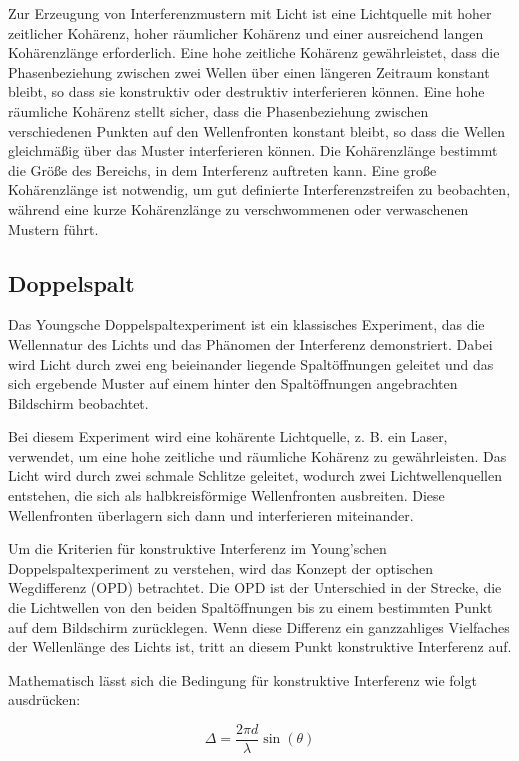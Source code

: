 \documentclass[12pt,english,ngerman]{scrartcl}
\begin{document}
Zur Erzeugung von Interferenzmustern mit Licht ist eine Lichtquelle mit hoher
zeitlicher Kohärenz, hoher räumlicher Kohärenz und einer ausreichend langen
Kohärenzlänge erforderlich. Eine hohe zeitliche Kohärenz gewährleistet, dass
die Phasenbeziehung zwischen zwei Wellen über einen längeren Zeitraum konstant
bleibt, so dass sie konstruktiv oder destruktiv interferieren können. Eine hohe
räumliche Kohärenz stellt sicher, dass die Phasenbeziehung zwischen
verschiedenen Punkten auf den Wellenfronten konstant bleibt, so dass die Wellen
gleichmäßig über das Muster interferieren können. Die Kohärenzlänge bestimmt
die Größe des Bereichs, in dem Interferenz auftreten kann. Eine große
Kohärenzlänge ist notwendig, um gut definierte Interferenzstreifen zu
beobachten, während eine kurze Kohärenzlänge zu verschwommenen oder
verwaschenen Mustern führt.

\subsection{Doppelspalt}

Das Youngsche Doppelspaltexperiment ist ein klassisches Experiment, das die
Wellennatur des Lichts und das Phänomen der Interferenz demonstriert. Dabei
wird Licht durch zwei eng beieinander liegende Spaltöffnungen geleitet und das
sich ergebende Muster auf einem hinter den Spaltöffnungen angebrachten
Bildschirm beobachtet.

Bei diesem Experiment wird eine kohärente Lichtquelle, z. B. ein Laser,
verwendet, um eine hohe zeitliche und räumliche Kohärenz zu gewährleisten. Das
Licht wird durch zwei schmale Schlitze geleitet, wodurch zwei
Lichtwellenquellen entstehen, die sich als halbkreisförmige Wellenfronten
ausbreiten. Diese Wellenfronten überlagern sich dann und interferieren
miteinander.

Um die Kriterien für konstruktive Interferenz im Young'schen
Doppelspaltexperiment zu verstehen, wird das Konzept der optischen Wegdifferenz
(OPD) betrachtet. Die OPD ist der Unterschied in der Strecke, die die
Lichtwellen von den beiden Spaltöffnungen bis zu einem bestimmten Punkt auf dem
Bildschirm zurücklegen. Wenn diese Differenz ein ganzzahliges Vielfaches der
Wellenlänge des Lichts ist, tritt an diesem Punkt konstruktive Interferenz auf.

Mathematisch lässt sich die Bedingung für konstruktive Interferenz wie folgt
ausdrücken:

\begin{equation}
	\Delta = \frac{2\pi d}{\lambda}\sin(\theta)
\end{equation}
\end{document}
